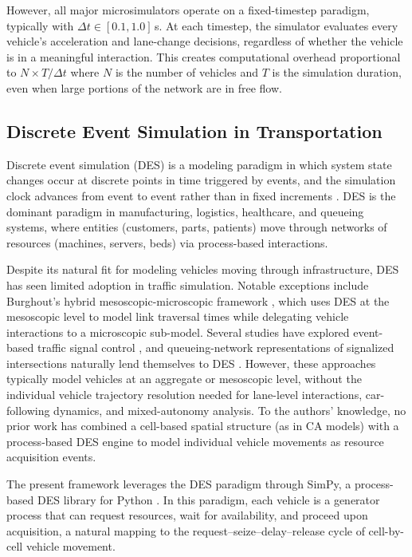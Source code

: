 \documentclass[review,authoryear]{elsarticle}
\begin{document}
However, all major microsimulators operate on a fixed-timestep paradigm, typically with $\Delta t \in [0.1, 1.0]$\,s. At each timestep, the simulator evaluates every vehicle's acceleration and lane-change decisions, regardless of whether the vehicle is in a meaningful interaction. This creates computational overhead proportional to $N \times T / \Delta t$ where $N$ is the number of vehicles and $T$ is the simulation duration, even when large portions of the network are in free flow.

\subsection{Discrete Event Simulation in Transportation}
\label{sec:lit_des}

Discrete event simulation (DES) is a modeling paradigm in which system state changes occur at discrete points in time triggered by events, and the simulation clock advances from event to event rather than in fixed increments \citep{banks2010discrete}. DES is the dominant paradigm in manufacturing, logistics, healthcare, and queueing systems, where entities (customers, parts, patients) move through networks of resources (machines, servers, beds) via process-based interactions.

Despite its natural fit for modeling vehicles moving through infrastructure, DES has seen limited adoption in traffic simulation. Notable exceptions include Burghout's hybrid mesoscopic-microscopic framework \citep{burghout2005hybrid}, which uses DES at the mesoscopic level to model link traversal times while delegating vehicle interactions to a microscopic sub-model. Several studies have explored event-based traffic signal control \citep{barcelo2010models}, and queueing-network representations of signalized intersections naturally lend themselves to DES \citep{osorio2013simulation}. However, these approaches typically model vehicles at an aggregate or mesoscopic level, without the individual vehicle trajectory resolution needed for lane-level interactions, car-following dynamics, and mixed-autonomy analysis. To the authors' knowledge, no prior work has combined a cell-based spatial structure (as in CA models) with a process-based DES engine to model individual vehicle movements as resource acquisition events.

The present framework leverages the DES paradigm through SimPy, a process-based DES library for Python \citep{simpy2023}. In this paradigm, each vehicle is a generator process that can request resources, wait for availability, and proceed upon acquisition, a natural mapping to the request--seize--delay--release cycle of cell-by-cell vehicle movement.
\end{document}
